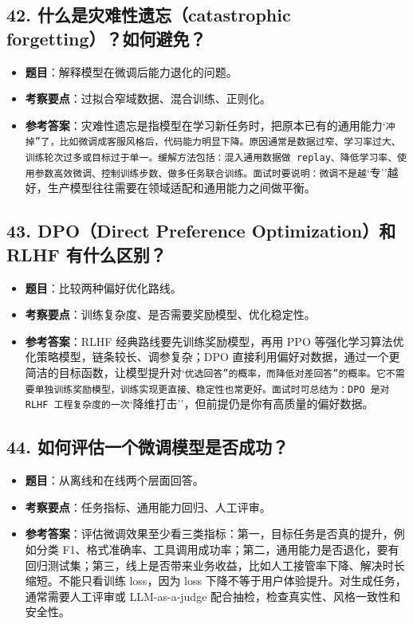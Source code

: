 \subsection{42. 什么是灾难性遗忘（catastrophic forgetting）？如何避免？}
\begin{itemize}[leftmargin=2em]
\item \textbf{题目}：解释模型在微调后能力退化的问题。
\item \textbf{考察要点}：过拟合窄域数据、混合训练、正则化。
\item \textbf{参考答案}：灾难性遗忘是指模型在学习新任务时，把原本已有的通用能力`\texttt{冲掉''了，比如微调成客服风格后，代码能力明显下降。原因通常是数据过窄、学习率过大、训练轮次过多或目标过于单一。缓解方法包括：混入通用数据做 replay、降低学习率、使用参数高效微调、控制训练步数、做多任务联合训练。面试时要说明：微调不是越}`专''越好，生产模型往往需要在领域适配和通用能力之间做平衡。
\end{itemize}

\subsection{43. DPO（Direct Preference Optimization）和 RLHF 有什么区别？}
\begin{itemize}[leftmargin=2em]
\item \textbf{题目}：比较两种偏好优化路线。
\item \textbf{考察要点}：训练复杂度、是否需要奖励模型、优化稳定性。
\item \textbf{参考答案}：RLHF 经典路线要先训练奖励模型，再用 PPO 等强化学习算法优化策略模型，链条较长、调参复杂；DPO 直接利用偏好对数据，通过一个更简洁的目标函数，让模型提升对`\texttt{优选回答''的概率，而降低对}\texttt{差回答''的概率。它不需要单独训练奖励模型，训练实现更直接、稳定性也常更好。面试时可总结为：DPO 是对 RLHF 工程复杂度的一次}`降维打击''，但前提仍是你有高质量的偏好数据。
\end{itemize}

\subsection{44. 如何评估一个微调模型是否成功？}
\begin{itemize}[leftmargin=2em]
\item \textbf{题目}：从离线和在线两个层面回答。
\item \textbf{考察要点}：任务指标、通用能力回归、人工评审。
\item \textbf{参考答案}：评估微调效果至少看三类指标：第一，目标任务是否真的提升，例如分类 F1、格式准确率、工具调用成功率；第二，通用能力是否退化，要有回归测试集；第三，线上是否带来业务收益，比如人工接管率下降、解决时长缩短。不能只看训练 loss，因为 loss 下降不等于用户体验提升。对生成任务，通常需要人工评审或 LLM-as-a-judge 配合抽检，检查真实性、风格一致性和安全性。
\end{itemize}

